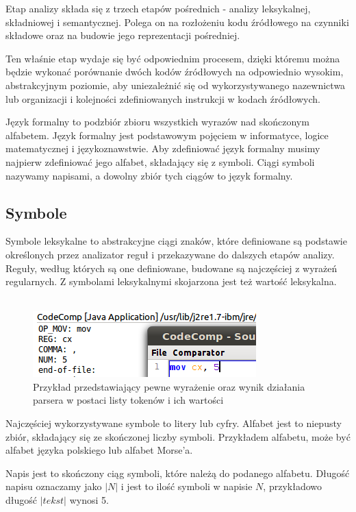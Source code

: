 \documentclass[a4paper,12pt,twoside]{article}
\begin{document}
Etap analizy składa się z trzech etapów pośrednich - analizy leksykalnej, składniowej i semantycznej. Polega on na rozłożeniu kodu źródłowego na czynniki składowe oraz na budowie jego reprezentacji pośredniej.

Ten właśnie etap wydaje się być odpowiednim procesem, dzięki któremu można będzie wykonać porównanie dwóch kodów źródłowych na odpowiednio wysokim, abstrakcyjnym poziomie, aby uniezależnić się od wykorzystywanego nazewnictwa lub organizacji i kolejności zdefiniowanych instrukcji w kodach źródłowych.

Język formalny to podzbiór zbioru wszystkich wyrazów nad skończonym alfabetem. Język formalny jest podstawowym pojęciem w informatyce, logice matematycznej i językoznawstwie. Aby zdefiniować język formalny musimy najpierw zdefiniować jego alfabet, składający się z symboli. Ciągi symboli nazywamy napisami, a dowolny zbiór tych ciągów to język formalny.

\subsection{Symbole}

Symbole leksykalne to abstrakcyjne ciągi znaków, które definiowane są podstawie określonych przez analizator reguł i przekazywane do dalszych etapów analizy. Reguły, według których są one definiowane, budowane są najczęściej z wyrażeń regularnych. Z symbolami leksykalnymi skojarzona jest też wartość leksykalna.
\\ \\
\begin{figure}[h!]
\centering
\includegraphics[scale=0.8]{gfx/tokens.png}
\caption{Przykład przedstawiający pewne wyrażenie oraz wynik działania parsera w postaci listy tokenów i ich wartości}
\end{figure}

Najczęściej wykorzystywane symbole to litery lub cyfry. Alfabet jest to niepusty zbiór, składający się ze skończonej liczby symboli. Przykładem alfabetu, może być alfabet języka polskiego lub alfabet Morse’a.

Napis jest to skończony ciąg symboli, które należą do podanego alfabetu. Długość napisu oznaczamy jako $|N|$ i jest to ilość symboli w napisie $N$, przykładowo długość $|tekst|$ wynosi 5.
\end{document}
